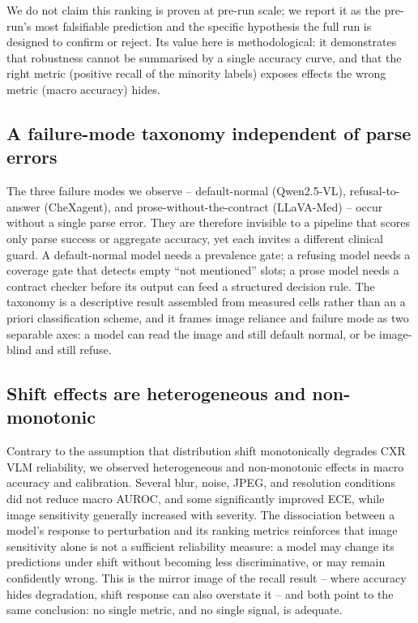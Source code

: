 We do not claim this ranking is proven at pre-run scale; we report it as the pre-run's most falsifiable prediction and the specific hypothesis the full run is designed to confirm or reject. Its value here is methodological: it demonstrates that robustness cannot be summarised by a single accuracy curve, and that the right metric (positive recall of the minority labels) exposes effects the wrong metric (macro accuracy) hides.

\subsection{A failure-mode taxonomy independent of parse errors}

The three failure modes we observe -- default-normal (Qwen2.5-VL), refusal-to-answer (CheXagent), and prose-without-the-contract (LLaVA-Med) -- occur without a single parse error. They are therefore invisible to a pipeline that scores only parse success or aggregate accuracy, yet each invites a different clinical guard. A default-normal model needs a prevalence gate; a refusing model needs a coverage gate that detects empty ``not mentioned'' slots; a prose model needs a contract checker before its output can feed a structured decision rule. The taxonomy is a descriptive result assembled from measured cells rather than an a priori classification scheme, and it frames image reliance and failure mode as two separable axes: a model can read the image and still default normal, or be image-blind and still refuse.

\subsection{Shift effects are heterogeneous and non-monotonic}

Contrary to the assumption that distribution shift monotonically degrades CXR VLM reliability, we observed heterogeneous and non-monotonic effects in macro accuracy and calibration. Several blur, noise, JPEG, and resolution conditions did not reduce macro AUROC, and some significantly improved ECE, while image sensitivity generally increased with severity. The dissociation between a model's response to perturbation and its ranking metrics reinforces that image sensitivity alone is not a sufficient reliability measure: a model may change its predictions under shift without becoming less discriminative, or may remain confidently wrong. This is the mirror image of the recall result -- where accuracy hides degradation, shift response can also overstate it -- and both point to the same conclusion: no single metric, and no single signal, is adequate.

